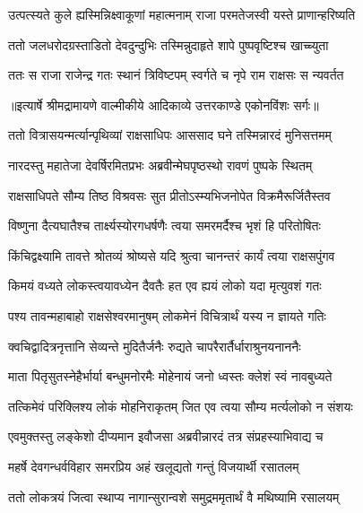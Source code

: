 \twolineshloka
{उत्पत्स्यते कुले ह्यस्मिन्निक्ष्वाकूणां महात्मनाम्}
{राजा परमतेजस्वी यस्ते प्राणान्हरिष्यति} %

\twolineshloka
{ततो जलधरोदग्रस्ताडितो देवदुन्दुभिः}
{तस्मिन्नुदाहृते शापे पुष्पवृष्टिश्च खाच्च्युता} %

\twolineshloka
{ततः स राजा राजेन्द्र गतः स्थानं त्रिविष्टपम्}
{स्वर्गते च नृपे राम राक्षसः स न्यवर्तत} %


{॥इत्यार्षे श्रीमद्रामायणे वाल्मीकीये आदिकाव्ये उत्तरकाण्डे एकोनविंशः सर्गः॥}


\twolineshloka
{ततो वित्रासयन्मर्त्यान्पृथिव्यां राक्षसाधिपः}
{आससाद घने तस्मिन्नारदं मुनिसत्तमम्} %

\twolineshloka
{नारदस्तु महातेजा देवर्षिरमितप्रभः}
{अब्रवीन्मेघपृष्ठस्थो रावणं पुष्पके स्थितम्} %

\twolineshloka
{राक्षसाधिपते सौम्य तिष्ठ विश्रवसः सुत}
{प्रीतोऽस्म्यभिजनोपेत विक्रमैरूर्जितैस्तव} %

\twolineshloka
{विष्णुना दैत्यघातैश्च तार्क्ष्यस्योरगधर्षणैः}
{त्वया समरमर्दैश्च भृशं हि परितोषितः} %

\twolineshloka
{किंचिद्वक्ष्यामि तावत्ते श्रोतव्यं श्रोष्यसे यदि}
{श्रुत्वा चानन्तरं कार्यं त्वया राक्षसपुंगव} %

\twolineshloka
{किमयं वध्यते लोकस्त्वयावध्येन दैवतैः}
{हत एव ह्ययं लोको यदा मृत्युवशं गतः} %

\twolineshloka
{पश्य तावन्महाबाहो राक्षसेश्वरमानुषम्}
{लोकमेनं विचित्रार्थं यस्य न ज्ञायते गतिः} %

\twolineshloka
{क्वचिद्वादित्रनृत्तानि सेव्यन्ते मुदितैर्जनैः}
{रुद्यते चापरैरार्तैर्धाराश्रुनयनाननैः} %

\twolineshloka
{माता पितृसुतस्नेहैर्भार्या बन्धुमनोरमैः}
{मोहेनायं जनो ध्वस्तः क्लेशं स्वं नावबुध्यते} %

\twolineshloka
{तत्किमेवं परिक्लिश्य लोकं मोहनिराकृतम्}
{जित एव त्वया सौम्य मर्त्यलोको न संशयः} %

\twolineshloka
{एवमुक्तस्तु लङ्केशो दीप्यमान इवौजसा}
{अब्रवीन्नारदं तत्र संप्रहस्याभिवाद्य च} %

\twolineshloka
{महर्षे देवगन्धर्वविहार समरप्रिय}
{अहं खलूद्यतो गन्तुं विजयार्थी रसातलम्} %

\twolineshloka
{ततो लोकत्रयं जित्वा स्थाप्य नागान्सुरान्वशे}
{समुद्रममृतार्थं वै मथिष्यामि रसालयम्} %

